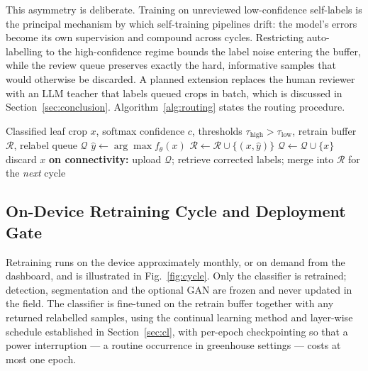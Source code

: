 \documentclass[journal]{IEEEtran}
\begin{document}
This asymmetry is deliberate. Training on unreviewed low-confidence self-labels is
the principal mechanism by which self-training pipelines drift: the model's errors
become its own supervision and compound across cycles. Restricting auto-labelling to
the high-confidence regime bounds the label noise entering the buffer, while the
review queue preserves exactly the hard, informative samples that would otherwise be
discarded. A planned extension replaces the human reviewer with an LLM teacher that
labels queued crops in batch, which is discussed in Section~\ref{sec:conclusion}.
Algorithm~\ref{alg:routing} states the routing procedure.

\begin{algorithm}[!t]
\caption{Confidence-Based Data Routing}
\label{alg:routing}
\begin{algorithmic}[1]
\REQUIRE Classified leaf crop $x$, softmax confidence $c$, thresholds
$\tau_{\text{high}} > \tau_{\text{low}}$, retrain buffer $\mathcal{R}$, relabel
queue $\mathcal{Q}$
\STATE $\hat{y} \leftarrow \arg\max f_\theta(x)$ 
    \STATE $\mathcal{R} \leftarrow \mathcal{R} \cup \{(x, \hat{y})\}$
    \STATE $\mathcal{Q} \leftarrow \mathcal{Q} \cup \{x\}$
\ELSE
    \STATE discard $x$ 
\ENDIF
\STATE \textbf{on connectivity:} upload $\mathcal{Q}$; retrieve corrected labels;
merge into $\mathcal{R}$ for the \emph{next} cycle
\end{algorithmic}
\end{algorithm}

\subsection{On-Device Retraining Cycle and Deployment Gate}

Retraining runs on the device approximately monthly, or on demand from the
dashboard, and is illustrated in Fig.~\ref{fig:cycle}. Only the classifier is
retrained; detection, segmentation and the optional GAN are frozen and never updated
in the field. The classifier is fine-tuned on the retrain buffer together with any
returned relabelled samples, using the continual learning method and layer-wise
schedule established in Section~\ref{sec:cl}, with per-epoch checkpointing so that a
power interruption --- a routine occurrence in greenhouse settings --- costs at most
one epoch.
\end{document}

